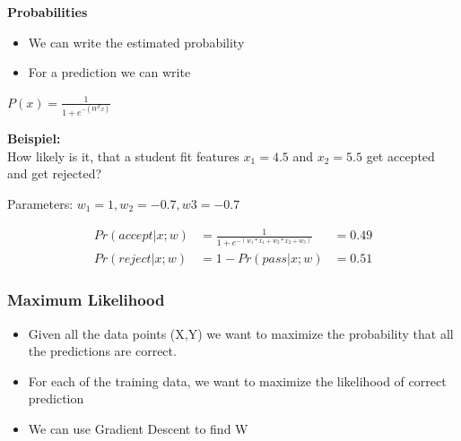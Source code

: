 \textbf{Probabilities}\\
\begin{minipage}{0.59\linewidth}
\begin{itemize}
    \item We can write the estimated probability
    \item For a prediction we can write
\end{itemize}
\end{minipage}
\begin{minipage}{0.4\linewidth}
\begin{center}
    $P(x) = \frac{1}{1 + e^{-(W^{T}x)}}$
\end{center}
\end{minipage}

\textbf{Beispiel:}\\
How likely is it, that a student fit features $x_1=4.5$ and $x_2=5.5$ get accepted and get rejected?\\
\begin{center}
Parameters: $w_1=1, w_2=-0.7, w3=-0.7$\\
\end{center}
\begin{align*}
Pr(accept|x;w) &= \frac{1}{1 + e^{-(w_1*x_1+w_2*x_2+w_3)}} &= 0.49\\
Pr(reject|x;w) &= 1 - Pr(pass|x;w) &= 0.51
\end{align*}

\subsubsection{Maximum Likelihood}
\begin{itemize}
    \item Given all the data points (X,Y) we want to maximize the probability that all the predictions are correct.
    \item For each of the training data, we want to maximize the likelihood of correct prediction
    \item We can use Gradient Descent to find W
\end{itemize}


